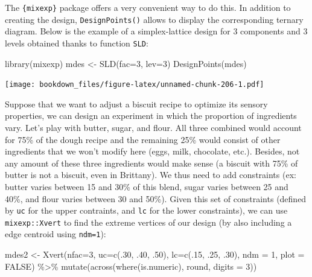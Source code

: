 \documentclass[
]{krantz}
\makeatletter
\newenvironment{Shaded}{\begin{snugshade}}{\end{snugshade}}
\newcommand{\AttributeTok}[1]{\textcolor[rgb]{0.61,0.61,0.61}{#1}}
\newcommand{\ConstantTok}[1]{\textcolor[rgb]{0,0,0}{#1}}
\newcommand{\DecValTok}[1]{\textcolor[rgb]{0.06,0.06,0.06}{#1}}
\newcommand{\FunctionTok}[1]{\textcolor[rgb]{0,0,0}{#1}}
\newcommand{\NormalTok}[1]{#1}
\newcommand{\OtherTok}[1]{\textcolor[rgb]{0.37,0.37,0.37}{#1}}
\newcommand{\SpecialCharTok}[1]{\textcolor[rgb]{0,0,0}{#1}}
\newenvironment{kframe}{%
\medskip{}
\setlength{\fboxsep}{.8em}
 \def\at@end@of@kframe{}%
 \ifinner\ifhmode%
  \def\at@end@of@kframe{\end{minipage}}%
  \begin{minipage}{\columnwidth}%
 \fi\fi%
 \def\FrameCommand##1{\hskip\@totalleftmargin \hskip-\fboxsep
 \colorbox{shadecolor}{##1}\hskip-\fboxsep
     \hskip-\linewidth \hskip-\@totalleftmargin \hskip\columnwidth}%
 \MakeFramed {\advance\hsize-\width
   \@totalleftmargin\z@ \linewidth\hsize
   \@setminipage}}%
 {\par\unskip\endMakeFramed%
 \at@end@of@kframe}
\renewenvironment{Shaded}{\begin{kframe}}{\end{kframe}}
\makeatother
\begin{document}
The \texttt{\{mixexp\}} package offers a very convenient way to do this. In addition to creating the design, \texttt{DesignPoints()} allows to display the corresponding ternary diagram. Below is the example of a simplex-lattice design for 3 components and 3 levels obtained thanks to function \texttt{SLD}:

\begin{Shaded}
\begin{Highlighting}[]
\FunctionTok{library}\NormalTok{(mixexp)}
\NormalTok{mdes }\OtherTok{\textless{}{-}} \FunctionTok{SLD}\NormalTok{(}\AttributeTok{fac=}\DecValTok{3}\NormalTok{, }\AttributeTok{lev=}\DecValTok{3}\NormalTok{)}
\FunctionTok{DesignPoints}\NormalTok{(mdes)}
\end{Highlighting}
\end{Shaded}

\texttt{[image: bookdown\_files/figure-latex/unnamed-chunk-206-1.pdf]}

Suppose that we want to adjust a biscuit recipe to optimize its sensory properties, we can design an experiment in which the proportion of ingredients vary. Let's play with butter, sugar, and flour. All three combined would account for 75\% of the dough recipe and the remaining 25\% would consist of other ingredients that we won't modify here (eggs, milk, chocolate, etc.). Besides, not any amount of these three ingredients would make sense (a biscuit with 75\% of butter is not a biscuit, even in Brittany). We thus need to add constraints (ex: butter varies between 15 and 30\% of this blend, sugar varies between 25 and 40\%, and flour varies between 30 and 50\%). Given this set of constraints (defined by \texttt{uc} for the upper contraints, and \texttt{lc} for the lower constraints), we can use \texttt{mixexp::Xvert} to find the extreme vertices of our design (by also including a edge centroid using \texttt{ndm=1}):

\begin{Shaded}
\begin{Highlighting}[]
\NormalTok{mdes2 }\OtherTok{\textless{}{-}} \FunctionTok{Xvert}\NormalTok{(}\AttributeTok{nfac=}\DecValTok{3}\NormalTok{, }\AttributeTok{uc=}\FunctionTok{c}\NormalTok{(.}\DecValTok{30}\NormalTok{, .}\DecValTok{40}\NormalTok{, .}\DecValTok{50}\NormalTok{), }\AttributeTok{lc=}\FunctionTok{c}\NormalTok{(.}\DecValTok{15}\NormalTok{, .}\DecValTok{25}\NormalTok{, .}\DecValTok{30}\NormalTok{), }
               \AttributeTok{ndm =} \DecValTok{1}\NormalTok{, }\AttributeTok{plot =} \ConstantTok{FALSE}\NormalTok{) }\SpecialCharTok{\%\textgreater{}\%} 
      \FunctionTok{mutate}\NormalTok{(}\FunctionTok{across}\NormalTok{(}\FunctionTok{where}\NormalTok{(is.numeric), round, }\AttributeTok{digits =} \DecValTok{3}\NormalTok{))}
\end{Highlighting}
\end{Shaded}
\end{document}
